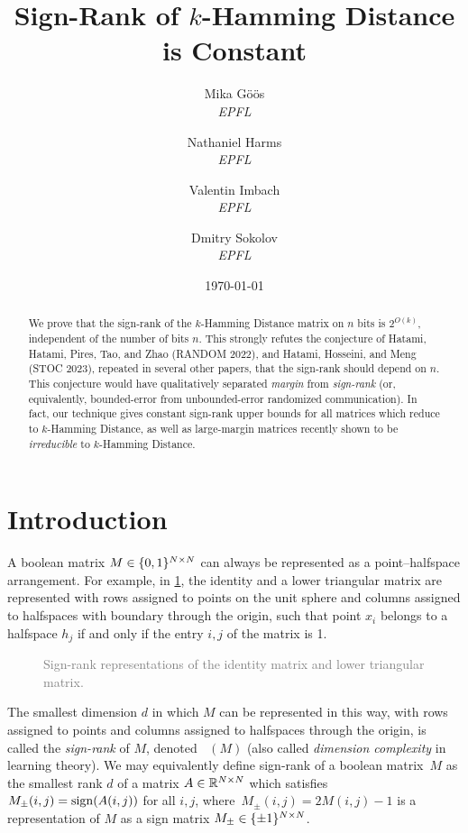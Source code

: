 \documentclass{article}
\title{Sign-Rank of $k$-Hamming Distance is Constant}
\author{
Mika G\"o\"os \\ {\slshape\normalsize EPFL}
\and
Nathaniel Harms \\ {\slshape\normalsize EPFL}
\and
Valentin Imbach \\ {\slshape\normalsize EPFL}
\and
Dmitry Sokolov \\ {\slshape\normalsize EPFL}
}
\date{\vspace{0.5em}\today}
\DeclareMathOperator{\signrank}{rank_\pm}
\begin{document}
\maketitle

\begin{abstract}\noindent
We prove that the sign-rank of the $k$-Hamming Distance matrix on $n$ bits is
$2^{O(k)}$, independent of the number of bits $n$. This strongly refutes the
conjecture of Hatami, Hatami, Pires, Tao, and Zhao ({\footnotesize RANDOM
2022}), and Hatami, Hosseini, and Meng ({\footnotesize STOC 2023}), repeated in
several other papers, that the sign-rank should depend on $n$.
This conjecture
would have qualitatively separated \emph{margin} from \emph{sign-rank} (or,
equivalently, bounded-error from unbounded-error randomized communication). In
fact, our technique gives constant sign-rank upper bounds for all matrices which
reduce to $k$-Hamming Distance, as well as large-margin matrices recently shown
to be \emph{irreducible} to $k$-Hamming Distance.
\end{abstract}

\vspace{2em}

{
\setcounter{tocdepth}{2} 
\tableofcontents
}
\thispagestyle{empty}
\setcounter{page}{0}
\newpage
\setcounter{page}{1}

\section{Introduction}

A boolean matrix $M \in \{0,1\}^{N \times N}$ can always be represented as a
point--halfspace arrangement. For example, in \cref{fig:identity}, the identity
and a lower triangular
matrix are represented with rows assigned to points
on the unit sphere and columns assigned to halfspaces with boundary through the
origin, such that point $x_i$ belongs to a halfspace $h_j$ if and only if the entry
$i,j$ of the matrix is 1.


\begin{figure}[h!]
    \begin{center}
        
    \end{center}
    \caption{\textcolor{Gray}{
            Sign-rank representations of the identity matrix and lower triangular matrix.
        }
    }
    \label{fig:identity}
\end{figure}

The smallest dimension $d$ in which $M$ can be
represented in this way, with rows assigned to points and columns assigned to
halfspaces through the origin, is called the \emph{sign-rank} of $M$, denoted
$\signrank(M)$ (also called \emph{dimension complexity} in learning theory). We
may equivalently define sign-rank of a boolean matrix~$M$ as the smallest rank
$d$ of a matrix $A \in \mathbb{R}^{N \times N}$ which satisfies $M_\pm(i,j) =
\operatorname{sign}(A(i,j))$ for all $i,j$, where~$M_\pm(i,j) = 2M(i,j) - 1$ is a
representation of $M$ as a sign matrix $M_\pm \in \{\pm 1\}^{N \times N}$.
\end{document}
